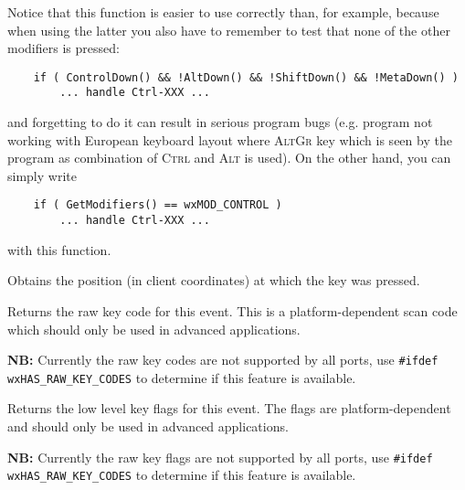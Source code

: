 Notice that this function is easier to use correctly than, for example, 
 because when using the latter you
also have to remember to test that none of the other modifiers is pressed:

\begin{verbatim}
    if ( ControlDown() && !AltDown() && !ShiftDown() && !MetaDown() )
        ... handle Ctrl-XXX ...
\end{verbatim}

and forgetting to do it can result in serious program bugs (e.g. program not
working with European keyboard layout where \textsc{AltGr} key which is seen by
the program as combination of \textsc{Ctrl} and \textsc{Alt} is used). On the
other hand, you can simply write

\begin{verbatim}
    if ( GetModifiers() == wxMOD_CONTROL )
        ... handle Ctrl-XXX ...
\end{verbatim}

with this function.


\label{wxkeyeventgetposition}



Obtains the position (in client coordinates) at which the key was pressed.


\label{wxkeyeventgetrawkeycode}


Returns the raw key code for this event. This is a platform-dependent scan code
which should only be used in advanced applications.

{\bf NB:} Currently the raw key codes are not supported by all ports, use
{\tt\#ifdef wxHAS\_RAW\_KEY\_CODES} to determine if this feature is available.


\label{wxkeyeventgetrawkeyflags}


Returns the low level key flags for this event. The flags are
platform-dependent and should only be used in advanced applications.

{\bf NB:} Currently the raw key flags are not supported by all ports, use
{\tt \#ifdef wxHAS\_RAW\_KEY\_CODES} to determine if this feature is available.


